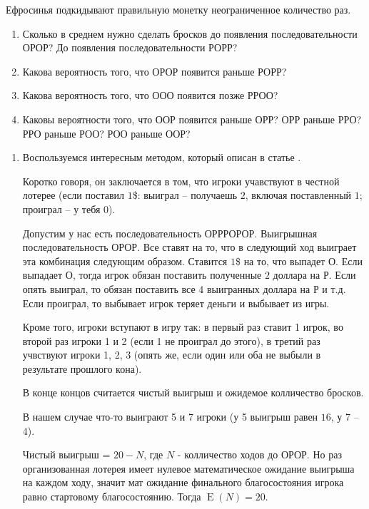 \documentclass[nobib]{tufte-handout}
\theoremstyle{definition}
\newcounter{problem}
\newenvironment{problem}%
{%
\refstepcounter{problem}%
     \hypertarget{problem:{\theproblem}}{}
     \Writetofile{solution_file}{\protect\hypertarget{soln:\theproblem}{}}
     \begin{myenum}[label=\bfseries\protect\hyperlink{soln:\theproblem}{\theproblem},ref=\theproblem]
     \item%
    }%
    {%
    \end{myenum}}
\DeclareMathOperator{\E}{E}
\begin{document}
\begin{problem}
Ефросинья подкидывают правильную монетку неограниченное количество раз.

\begin{enumerate}
\item Сколько в среднем нужно сделать бросков до появления последовательности ОРОР?
До появления последовательности РОРР?
\item Какова вероятность того, что ОРОР появится раньше РОРР?
\item Какова вероятность того, что ООО появится позже РРОО?
\item Каковы вероятности того, что ООР появится раньше ОРР? ОРР раньше РРО?
РРО раньше РОО? РОО раньше ООР?
\end{enumerate}



\begin{sol}
\begin{enumerate}
\item Воспользуемся интересным методом, который описан в статье \cite{li1980martingale}.

Коротко говоря, он заключается в том, что игроки учавствуют в честной лотерее (если поставил $1$\$: выиграл – получаешь $2$, включая поставленный $1$; проиграл – у тебя $0$).

Допустим у нас есть последовательность ОРРРОРОР. Выигрышная последовательность ОРОР. Все ставят на то, что в следующий ход выиграет эта комбинация следующим образом. Ставится $1$\$ на то, что выпадет О. Если выпадает О, тогда игрок обязан поставить полученные $2$ доллара на Р. Если опять выиграл, то обязан поставить все $4$ выигранных доллара на Р и т.д. Если проиграл, то выбывает игрок теряет деньги и выбывает из игры.

Кроме того, игроки вступают в игру так: в первый раз ставит 1 игрок, во второй раз игроки 1 и 2 (если 1 не проиграл до этого), в третий раз учвствуют игроки 1,  2, 3 (опять же, если один или оба не выбыли в результате прошлого кона).

В конце концов считается чистый выигрыш и ожидемое колличество бросков.

В нашем случае что-то выиграют 5 и 7 игроки (у 5 выигрыш равен $16$, у 7 – $4$).

Чистый выигрыш = $20 - N$, где $N$ - колличество ходов до ОРОР. Но раз организованная лотерея имеет нулевое математическое ожидание выигрыша на каждом ходу, значит мат ожидание финального благосостояния игрока равно стартовому благосостоянию. Тогда $\E(N) = 20$.


\end{enumerate}
\end{sol}
\end{problem}
\end{document}
